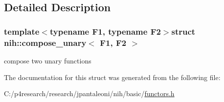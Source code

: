 \subsection{\-Detailed \-Description}
\subsubsection*{template$<$typename F1, typename F2$>$struct nih\-::compose\-\_\-unary$<$ F1, F2 $>$}

compose two unary functions 

\-The documentation for this struct was generated from the following file\-:\begin{DoxyCompactItemize}
\item 
\-C\-:/p4research/research/jpantaleoni/nih/basic/\hyperlink{functors_8h}{functors.\-h}\end{DoxyCompactItemize}

